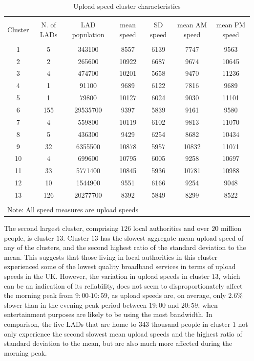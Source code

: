 \documentclass[,]{sagej}
\begin{document}
\begin{table}[!htbp] \centering 
  \caption{Upload speed cluster characteristics\label{up.cluster.descr}} 
  \label{} 
\footnotesize 
\begin{tabular}{@{\extracolsep{0pt}} ccccccc} 
\\[-1.8ex]\hline 
\hline \\[-1.8ex] 
Cluster & N. of LADs & LAD population & mean speed & SD speed & mean AM speed & mean PM speed \\ 
\hline \\[-1.8ex] 
1 & 5 & 343100 & 8557 & 6139 & 7747 & 9563 \\ 
2 & 2 & 265600 & 10922 & 6687 & 9674 & 10645 \\ 
3 & 4 & 474700 & 10201 & 5658 & 9470 & 11236 \\ 
4 & 1 & 91100 & 9689 & 6122 & 7816 & 9689 \\ 
5 & 1 & 79800 & 10127 & 6024 & 9030 & 11101 \\ 
6 & 155 & 29535700 & 9397 & 5839 & 9161 & 9580 \\ 
7 & 4 & 559800 & 10119 & 6102 & 9813 & 11070 \\ 
8 & 5 & 436300 & 9429 & 6254 & 8682 & 10434 \\ 
9 & 32 & 6355500 & 10878 & 5957 & 10832 & 11071 \\ 
10 & 4 & 699600 & 10795 & 6005 & 9258 & 10697 \\ 
11 & 33 & 5771400 & 10845 & 5936 & 10781 & 10988 \\ 
12 & 10 & 1544900 & 9551 & 6166 & 9254 & 9048 \\ 
13 & 126 & 20277700 & 8392 & 5849 & 8299 & 8522 \\ 
\hline \\[-1.8ex] 
\multicolumn{7}{l}{Note: All speed measures are upload speeds} \\ 
\end{tabular} 
\end{table}

The second largest cluster, comprising \(126\) local authorities and
over \(20\) million people, is cluster \(13\). Cluster \(13\) has the
slowest aggregate mean upload speed of any of the clusters, and the
second highest ratio of the standard deviation to the mean. This
suggests that those living in local authorities in this cluster
experienced some of the lowest quality broadband services in terms of
upload speeds in the UK. However, the variation in upload speeds in
cluster \(13\), which can be an indication of its reliability, does not
seem to disproportionately affect the morning peak from
\(9:00\)-\(10:59\), as upload speeds are, on average, only \(2.6\)\%
slower than in the evening peak period between \(19:00\) and \(20:59\),
when entertainment purposes are likely to be using the most bandwidth.
In comparison, the five LADs that are home to \(343\) thousand people in
cluster \(1\) not only experience the second slowest mean upload speeds
and the highest ratio of standard deviation to the mean, but are also
much more affected during the morning peak.
\end{document}
